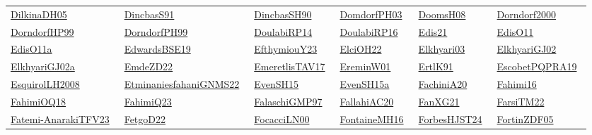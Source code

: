\begin{longtable}{*{6}{l}}
\href{../works/DilkinaDH05.pdf}{DilkinaDH05}~\cite{DilkinaDH05} & \href{../works/DincbasS91.pdf}{DincbasS91}~\cite{DincbasS91} & \href{../works/DincbasSH90.pdf}{DincbasSH90}~\cite{DincbasSH90} & \href{../}{DomdorfPH03}~\cite{DomdorfPH03} & \href{../works/DoomsH08.pdf}{DoomsH08}~\cite{DoomsH08} & \href{../}{Dorndorf2000}~\cite{Dorndorf2000}\\ 
\href{../}{DorndorfHP99}~\cite{DorndorfHP99} & \href{../}{DorndorfPH99}~\cite{DorndorfPH99} & \href{../works/DoulabiRP14.pdf}{DoulabiRP14}~\cite{DoulabiRP14} & \href{../works/DoulabiRP16.pdf}{DoulabiRP16}~\cite{DoulabiRP16} & \href{../}{Edis21}~\cite{Edis21} & \href{../works/EdisO11.pdf}{EdisO11}~\cite{EdisO11}\\ 
\href{../}{EdisO11a}~\cite{EdisO11a} & \href{../}{EdwardsBSE19}~\cite{EdwardsBSE19} & \href{../works/EfthymiouY23.pdf}{EfthymiouY23}~\cite{EfthymiouY23} & \href{../works/ElciOH22.pdf}{ElciOH22}~\cite{ElciOH22} & \href{../works/Elkhyari03.pdf}{Elkhyari03}~\cite{Elkhyari03} & \href{../works/ElkhyariGJ02.pdf}{ElkhyariGJ02}~\cite{ElkhyariGJ02}\\ 
\href{../works/ElkhyariGJ02a.pdf}{ElkhyariGJ02a}~\cite{ElkhyariGJ02a} & \href{../works/EmdeZD22.pdf}{EmdeZD22}~\cite{EmdeZD22} & \href{../}{EmeretlisTAV17}~\cite{EmeretlisTAV17} & \href{../works/EreminW01.pdf}{EreminW01}~\cite{EreminW01} & \href{../works/ErtlK91.pdf}{ErtlK91}~\cite{ErtlK91} & \href{../works/EscobetPQPRA19.pdf}{EscobetPQPRA19}~\cite{EscobetPQPRA19}\\ 
\href{../}{EsquirolLH2008}~\cite{EsquirolLH2008} & \href{../works/EtminaniesfahaniGNMS22.pdf}{EtminaniesfahaniGNMS22}~\cite{EtminaniesfahaniGNMS22} & \href{../works/EvenSH15.pdf}{EvenSH15}~\cite{EvenSH15} & \href{../works/EvenSH15a.pdf}{EvenSH15a}~\cite{EvenSH15a} & \href{../}{FachiniA20}~\cite{FachiniA20} & \href{../works/Fahimi16.pdf}{Fahimi16}~\cite{Fahimi16}\\ 
\href{../works/FahimiOQ18.pdf}{FahimiOQ18}~\cite{FahimiOQ18} & \href{../}{FahimiQ23}~\cite{FahimiQ23} & \href{../works/FalaschiGMP97.pdf}{FalaschiGMP97}~\cite{FalaschiGMP97} & \href{../works/FallahiAC20.pdf}{FallahiAC20}~\cite{FallahiAC20} & \href{../works/FanXG21.pdf}{FanXG21}~\cite{FanXG21} & \href{../works/FarsiTM22.pdf}{FarsiTM22}~\cite{FarsiTM22}\\ 
\href{../works/Fatemi-AnarakiTFV23.pdf}{Fatemi-AnarakiTFV23}~\cite{Fatemi-AnarakiTFV23} & \href{../works/FetgoD22.pdf}{FetgoD22}~\cite{FetgoD22} & \href{../works/FocacciLN00.pdf}{FocacciLN00}~\cite{FocacciLN00} & \href{../works/FontaineMH16.pdf}{FontaineMH16}~\cite{FontaineMH16} & \href{../works/ForbesHJST24.pdf}{ForbesHJST24}~\cite{ForbesHJST24} & \href{../works/FortinZDF05.pdf}{FortinZDF05}~\cite{FortinZDF05}\\ 

\end{longtable}
